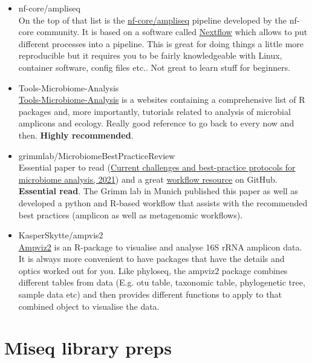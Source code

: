 \documentclass[
]{book}
\begin{document}
\begin{itemize}
\item
  nf-core/ampliseq\\
  On the top of that list is the \href{https://github.com/topics/amplicon-sequencing}{nf-core/ampliseq} pipeline developed by the nf-core community. It is based on a software called \href{https://www.nextflow.io/}{Nextflow} which allows to put different processes into a pipeline. This is great for doing things a little more reproducible but it requires you to be fairly knowledgeable with Linux, container software, config files etc.. Not great to learn stuff for beginners.
\item
  Tools-Microbiome-Analysis\\
  \href{https://microsud.github.io/Tools-Microbiome-Analysis/}{Tools-Microbiome-Analysis} is a websites containing a comprehensive list of R packages and, more importantly, tutorials related to analysis of microbial amplicons and ecology. Really good reference to go back to every now and then. \textbf{Highly recommended}.
\item
  grimmlab/MicrobiomeBestPracticeReview\\
  Essential paper to read (\href{https://academic.oup.com/bib/article/22/1/178/5678919}{Current challenges and best-practice protocols for microbiome analysis, 2021}) and a great \href{https://github.com/grimmlab/MicrobiomeBestPracticeReview}{workflow resource} on GitHub. \textbf{Essential read}. The Grimm lab in Munich published this paper as well as developed a python and R-based workflow that assists with the recommended best practices (amplicon as well as metagenomic workflows).
\item
  KasperSkytte/ampvis2\\
  \href{https://kasperskytte.github.io/ampvis2/articles/ampvis2.html}{Ampviz2} is an R-package to visualise and analyse 16S rRNA amplicon data. It is always more convenient to have packages that have the details and optics worked out for you. Like phyloseq, the ampviz2 package combines different tables from data (E.g. otu table, taxonomic table, phylogenetic tree, sample data etc) and then provides different functions to apply to that combined object to visualise the data.
\end{itemize}

\hypertarget{miseq-library-preps}{%
\chapter{Miseq library preps}\label{miseq-library-preps}}
\end{document}
